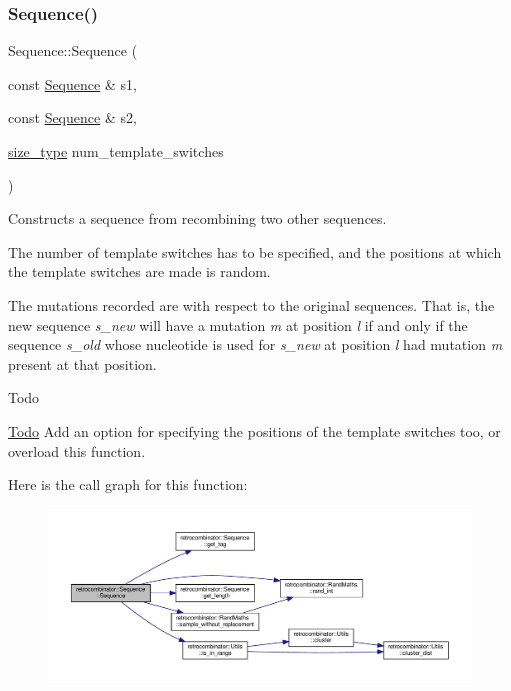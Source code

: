 \subsubsection{\texorpdfstring{Sequence()}{Sequence()}\hspace{0.1cm}{\footnotesize\ttfamily [3/3]}}
{\footnotesize\ttfamily Sequence\+::\+Sequence (\begin{DoxyParamCaption}\item[{const \hyperlink{classretrocombinator_1_1Sequence}{Sequence} \&}]{s1,  }\item[{const \hyperlink{classretrocombinator_1_1Sequence}{Sequence} \&}]{s2,  }\item[{\hyperlink{namespaceretrocombinator_a8e1541b50cee66a791df4c437ccbb385}{size\+\_\+type}}]{num\+\_\+template\+\_\+switches }\end{DoxyParamCaption})}



Constructs a sequence from recombining two other sequences. 

The number of template switches has to be specified, and the positions at which the template switches are made is random.

The mutations recorded are with respect to the original sequences. That is, the new sequence {\itshape s\+\_\+new} will have a mutation {\itshape m} at position {\itshape l} if and only if the sequence {\itshape s\+\_\+old} whose nucleotide is used for {\itshape s\+\_\+new} at position {\itshape l} had mutation {\itshape m} present at that position.

\begin{DoxyRefDesc}{Todo}
\item[\hyperlink{todo__todo000001}{Todo}]Add an option for specifying the positions of the template switches too, or overload this function. \end{DoxyRefDesc}
Here is the call graph for this function\+:\nopagebreak
\begin{figure}[H]
\begin{center}
\leavevmode
\includegraphics[width=350pt]{classretrocombinator_1_1Sequence_af334c44bea806196b5037e61b0e831b1_cgraph}
\end{center}
\end{figure}



